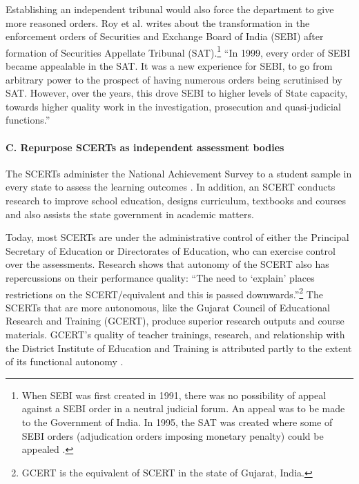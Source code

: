 \documentclass[a4paper, 12pt, twoside]{article}
\begin{document}
Establishing an independent tribunal would also force the department to give more reasoned orders. Roy et al. \parencite*{roy_etal} writes about the transformation in the enforcement orders of Securities and Exchange Board of India (SEBI) after formation of Securities Appellate Tribunal (SAT).\footnote{When SEBI was first created in 1991, there was no possibility of appeal against a SEBI order in a neutral judicial forum. An appeal was to be made to the Government of India. In 1995, the SAT was created where some of SEBI orders (adjudication orders imposing monetary penalty) could be appealed \parencite{roy_etal}.} “In 1999, every order of SEBI became appealable in the SAT. It was a new experience for SEBI, to go from arbitrary power to the prospect of having numerous orders being scrutinised by SAT. However, over the years, this drove SEBI to higher levels of State capacity, towards higher quality work in the investigation, prosecution and quasi-judicial functions.”

\paragraph*{C. Repurpose SCERTs as independent assessment bodies}

The SCERTs administer the National Achievement Survey to a student sample in every state to assess the learning outcomes \parencite{ncert_scert}. In addition, an SCERT conducts research to improve school education, designs curriculum, textbooks and courses and also assists the state government in academic matters.

Today, most SCERTs are under the administrative control of either the Principal Secretary of Education or Directorates of Education, who can exercise control over the assessments. Research shows that autonomy of the SCERT also has repercussions on their performance quality: “The need to ‘explain’ places restrictions on the SCERT/equivalent and this is passed downwards.”\footnote{GCERT is the equivalent of SCERT in the state of Gujarat, India.} The SCERTs that are more autonomous, like the Gujarat Council of Educational Research and Training (GCERT), produce superior research outputs and course materials. GCERT’s quality of teacher trainings, research, and relationship with the District Institute of Education and Training is attributed partly to the extent of its functional autonomy \parencite{scert_evidence}.
\end{document}
